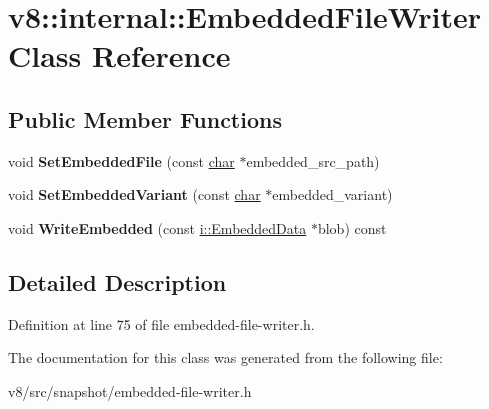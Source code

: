 \hypertarget{classv8_1_1internal_1_1EmbeddedFileWriter}{}\section{v8\+:\+:internal\+:\+:Embedded\+File\+Writer Class Reference}
\label{classv8_1_1internal_1_1EmbeddedFileWriter}
\subsection*{Public Member Functions}
\begin{DoxyCompactItemize}
\item 
\mbox{\label{classv8_1_1internal_1_1EmbeddedFileWriter_ae2a0a0d554e946cb6b78dc29e89d240c}} 
void {\bfseries Set\+Embedded\+File} (const \mbox{\hyperlink{classchar}{char}} $\ast$embedded\+\_\+src\+\_\+path)
\item 
\mbox{\label{classv8_1_1internal_1_1EmbeddedFileWriter_abe4bbafc5c8709c4dffb41c09add021c}} 
void {\bfseries Set\+Embedded\+Variant} (const \mbox{\hyperlink{classchar}{char}} $\ast$embedded\+\_\+variant)
\item 
\mbox{\label{classv8_1_1internal_1_1EmbeddedFileWriter_a7a174ac5537b0a9fa5f0ae87a508688d}} 
void {\bfseries Write\+Embedded} (const \mbox{\hyperlink{classv8_1_1internal_1_1EmbeddedData}{i\+::\+Embedded\+Data}} $\ast$blob) const
\end{DoxyCompactItemize}


\subsection{Detailed Description}


Definition at line 75 of file embedded-\/file-\/writer.\+h.



The documentation for this class was generated from the following file\+:\begin{DoxyCompactItemize}
\item 
v8/src/snapshot/embedded-\/file-\/writer.\+h\end{DoxyCompactItemize}
